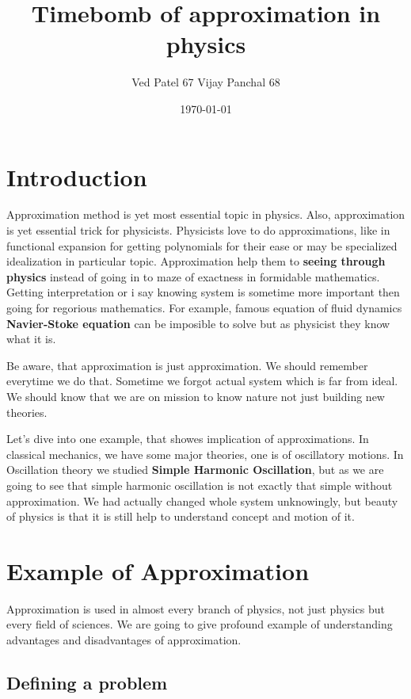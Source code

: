 \documentclass[11pt,a4paper]{article}
\author{Ved Patel 67 Vijay Panchal 68}
\date{\today}
\title{Timebomb of approximation in physics}
\begin{document}
\maketitle
\tableofcontents

\pagebreak
\section{Introduction}
\label{sec:org5ac4def}

Approximation method is yet most essential topic in physics. Also, approximation is yet essential trick for physicists. Physicists love to do approximations, like in functional expansion for getting polynomials for their ease or may be specialized idealization in particular topic. Approximation help them to \textbf{seeing through physics} instead of going in to maze of exactness in formidable  mathematics. Getting interpretation or i say knowing system is sometime more important then going for regorious mathematics. For example, famous equation of fluid dynamics \textbf{Navier-Stoke equation} can be imposible to solve but as physicist they know what it is.

Be aware, that approximation is just approximation. We should remember everytime we do that. Sometime we forgot actual system which is far from ideal. We should know that we are on mission to know nature not just building new theories.

Let's dive into one example, that showes implication of approximations. In classical mechanics, we have some major theories, one is of oscillatory motions. In Oscillation theory we studied \textbf{Simple Harmonic Oscillation}, but as we are going to see that simple harmonic oscillation is not exactly that simple without approximation. We had actually changed whole system unknowingly, but beauty of physics is that it is still help to understand concept and motion of it. 

\section{Example of Approximation}
\label{sec:org8096303}

Approximation is used in almost every branch of physics, not just physics but every field of sciences. We are going to give profound example of understanding advantages and disadvantages of approximation.

\subsection{Defining a problem}
\label{sec:orge23eda3}
\end{document}
